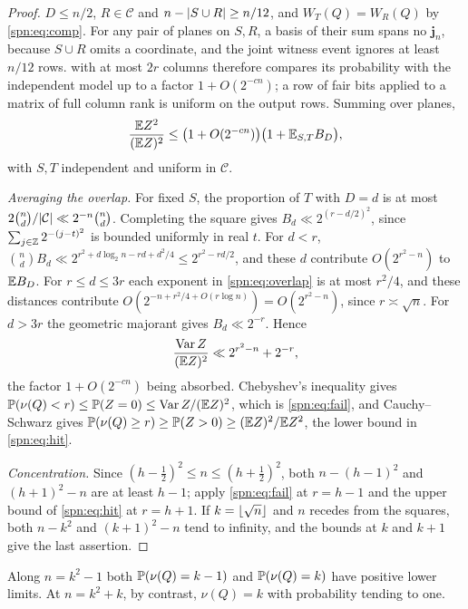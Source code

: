 \begin{proof}
$D\le n/2$, $R\in\mathcal C$ and $n-\lvert S\cup R\rvert\ge n/12$, and $W_T(Q)=W_R(Q)$ by
\eqref{spn:eq:comp}. For any pair of planes on $S,R$, a basis of their sum spans no
$\mathbf j_n$, because $S\cup R$ omits a coordinate, and the joint witness event ignores at
least $n/12$ rows.  with at most $2r$ columns therefore compares its
probability with the independent model up to a factor $1+O(2^{-cn})$; a row of fair bits
applied to a matrix of full column rank is uniform on the output rows. Summing over planes,
\[
 \frac{\mathbb{E} Z^2}{(\mathbb{E} Z)^2}\le\bigl(1+O(2^{-cn})\bigr)\bigl(1+\mathbb{E}_{S,T}B_D\bigr),
\]
with $S,T$ independent and uniform in $\mathcal C$.

\emph{Averaging the overlap.} For fixed $S$, the proportion of $T$ with $D=d$ is at most
$2\binom nd/\lvert\mathcal C\rvert\ll2^{-n}\binom nd$. Completing the square gives
$B_d\ll2^{(r-d/2)^2}$, since $\sum_{j\in\mathbb{Z}}2^{-(j-t)^2}$ is bounded uniformly in real $t$.
For $d<r$, $\binom ndB_d\ll2^{r^2+d\log_2n-rd+d^2/4}\le2^{r^2-rd/2}$, and these $d$ contribute
$O(2^{r^2-n})$ to $\mathbb{E} B_D$. For $r\le d\le3r$ each exponent in \eqref{spn:eq:overlap} is at
most $r^2/4$, and these distances contribute $O(2^{-n+r^2/4+O(r\log n)})=O(2^{r^2-n})$, since
$r\asymp\sqrt n$. For $d>3r$ the geometric majorant gives $B_d\ll2^{-r}$. Hence
\begin{equation}\label{spn:eq:variance}
 \frac{\operatorname{Var}Z}{(\mathbb{E} Z)^2}\ll2^{r^2-n}+2^{-r},
\end{equation}
the factor $1+O(2^{-cn})$ being absorbed. Chebyshev's inequality gives
$\mathbb{P}(\nu(Q)<r)\le\mathbb{P}(Z=0)\le\operatorname{Var}Z/(\mathbb{E} Z)^2$, which is \eqref{spn:eq:fail},
and Cauchy--Schwarz gives $\mathbb{P}(\nu(Q)\ge r)\ge\mathbb{P}(Z>0)\ge(\mathbb{E} Z)^2/\mathbb{E} Z^2$, the lower
bound in \eqref{spn:eq:hit}.

\emph{Concentration.} Since $(h-\tfrac12)^2\le n\le(h+\tfrac12)^2$, both $n-(h-1)^2$ and
$(h+1)^2-n$ are at least $h-1$; apply \eqref{spn:eq:fail} at $r=h-1$ and the upper bound of
\eqref{spn:eq:hit} at $r=h+1$. If $k=\lfloor\sqrt n\rfloor$ and $n$ recedes from the squares, both
$n-k^2$ and $(k+1)^2-n$ tend to infinity, and the bounds at $k$ and $k+1$ give the last
assertion.
\end{proof}

\begin{corollary}\label{spn:cor:twovalues}
Along $n=k^2-1$ both $\mathbb{P}(\nu(Q)=k-1)$ and $\mathbb{P}(\nu(Q)=k)$ have positive lower limits. At
$n=k^2+k$, by contrast, $\nu(Q)=k$ with probability tending to one.
\end{corollary}

